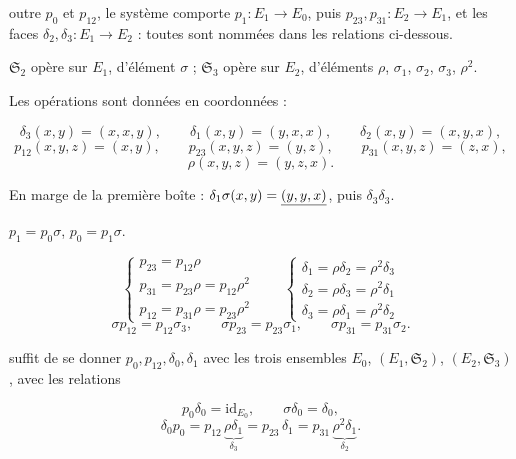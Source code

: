 \documentclass[11pt,a4paper]{article}
\begin{document}
outre $p_0$ et $p_{12}$, le système comporte
$p_1 \colon E_1 \to E_0$, puis $p_{23}, p_{31} \colon E_2 \to E_1$, et les
faces $\delta_2, \delta_3 \colon E_1 \to E_2$ : toutes sont nommées dans les
relations ci-dessous.

$\mathfrak{S}_2$ opère sur $E_1$, d'élément $\sigma$ ; $\mathfrak{S}_3$ opère sur
$E_2$, d'éléments $\rho$, $\sigma_1$, $\sigma_2$, $\sigma_3$, $\rho^2$.


Les opérations sont données en coordonnées :

\[
  \delta_3(x,y) = (x,x,y), \qquad
  \delta_1(x,y) = (y,x,x), \qquad
  \delta_2(x,y) = (x,y,x),
\]
\[
  p_{12}(x,y,z) = (x,y), \qquad
  p_{23}(x,y,z) = (y,z), \qquad
  p_{31}(x,y,z) = (z,x),
\]
\[
  \rho(x,y,z) = (y,z,x).
\]

En marge de la première boîte : $\delta_1\sigma(x,y) = \uncertain{(y,y,x)}$,
puis $\delta_3\delta_3$.

$p_1 = p_0\sigma$, $p_0 = p_1\sigma$.


\[
  \begin{cases}
    p_{23} = p_{12}\rho \\
    p_{31} = p_{23}\rho = p_{12}\rho^2 \\
    p_{12} = p_{31}\rho = p_{23}\rho^2
  \end{cases}
  \qquad
  \begin{cases}
    \delta_1 = \rho\delta_2 = \rho^2\delta_3 \\
    \delta_2 = \rho\delta_3 = \rho^2\delta_1 \\
    \delta_3 = \rho\delta_1 = \rho^2\delta_2
  \end{cases}
\]
\[
  \sigma p_{12} = p_{12}\sigma_3, \qquad
  \sigma p_{23} = p_{23}\sigma_1, \qquad
  \sigma p_{31} = p_{31}\sigma_2.
\]

 suffit de se donner $p_0, p_{12}, \delta_0, \delta_1$ avec les
trois ensembles $E_0$, $(E_1,\mathfrak{S}_2)$, $(E_2,\mathfrak{S}_3)$, avec les
relations

\[
  \boxed{p_0\delta_0 = \mathrm{id}_{E_0}}, \qquad \boxed{\sigma\delta_0 = \delta_0},
\]
\[
  \delta_0p_0 = p_{12}\,\underbrace{\rho\delta_1}_{\delta_3}
             = p_{23}\,\delta_1
             = p_{31}\,\underbrace{\rho^2\delta_1}_{\delta_2}.
\]
\end{document}
